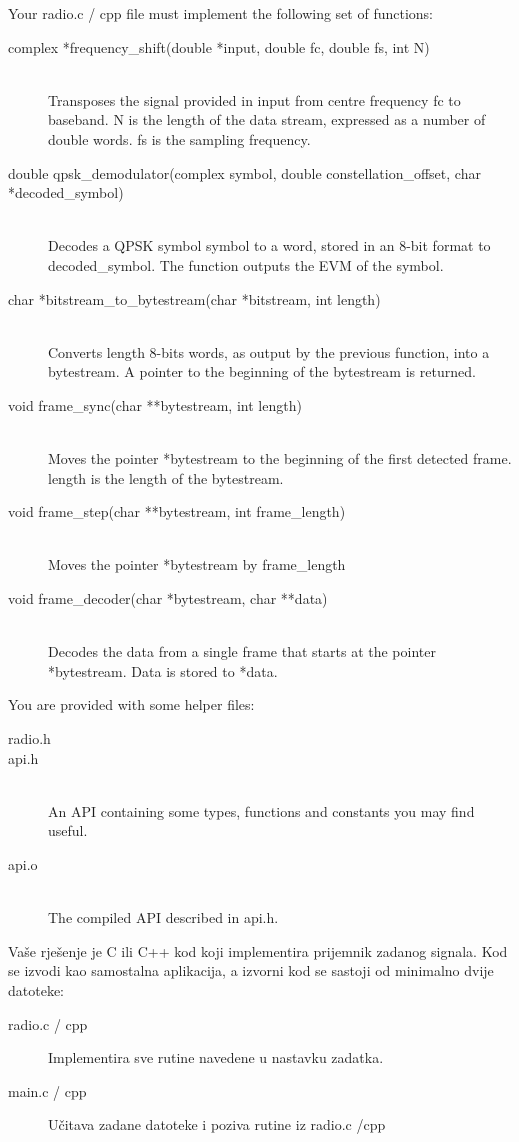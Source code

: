 \documentclass[a4paper]{article}
\begin{document}
Your radio.c / cpp file must implement the following set of functions:
\begin{description}
	\item[complex *frequency\_shift(double *input, double fc, double fs, int N)]
	\,\\ Transposes the signal provided in input from centre frequency \textsf{fc} to baseband. \textsf{N} is the length of the data stream, expressed as a number of double words. \textsf{fs} is the sampling frequency.
	\item[double qpsk\_demodulator(complex symbol, double constellation\_offset, char *decoded\_symbol)]
	\,\\ Decodes a QPSK symbol \textsf{symbol} to a word, stored in an 8-bit format to \textsf{decoded\_symbol}. The function outputs the EVM of the symbol.
	\item[char *bitstream\_to\_bytestream(char *bitstream, int length)]
	\,\\ Converts \textsf{length} 8-bits words, as output by the previous function, into a bytestream. A pointer to the beginning of the bytestream is returned.
	\item[void frame\_sync(char **bytestream, int length)]
	\,\\ Moves the pointer \textsf{*bytestream} to the beginning of the first detected frame. \textsf{length} is the length of the bytestream.
	\item[void frame\_step(char **bytestream, int frame\_length)]
	\,\\ Moves the pointer \textsf{*bytestream} by \textsf{frame\_length}
	\item[void frame\_decoder(char *bytestream, char **data)]
	\,\\ Decodes the data from a single frame that starts at the pointer \textsf{*bytestream}. Data is stored to \textsf{*data}.
\end{description}

You are provided with some helper files:
\begin{description}
	\item[radio.h]
	\item[api.h]
	\,\\ An API containing some types, functions and constants you may find useful.
	\item[api.o]
	\,\\ The compiled API described in \textsf{api.h}.
\end{description}
Vaše rješenje je C ili C++ kod koji implementira prijemnik zadanog signala. Kod se izvodi kao samostalna aplikacija, a izvorni kod se sastoji od minimalno dvije datoteke:
\begin{description}
	\item[radio.c / cpp] Implementira sve rutine navedene u nastavku zadatka.
	\item[main.c / cpp] Učitava zadane datoteke i poziva rutine iz radio.c /cpp
\end{description}
\end{document}
